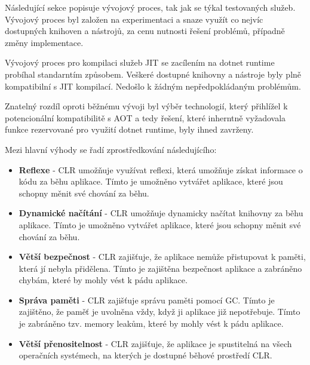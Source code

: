 

Následující sekce popisuje vývojový proces, tak jak se týkal testovaných služeb. Vývojový proces byl založen na experimentaci a snaze využít co nejvíc dostupných knihoven a nástrojů, za cenu nutnosti řešení problémů, případně změny implementace.


Vývojový proces pro kompilaci služeb JIT se zacílením na dotnet runtime probíhal standarntím způsobem. Veškeré dostupné knihovny a nástroje byly plně kompatibilní s JIT kompilací. Nedošlo k žádným nepředpokládaným problémům.

Znatelný rozdíl oproti běžnému vývoji byl výběr technologií, který přihlížel k potencionální kompatibilitě s AOT a tedy řešení, které inherntně vyžadovala funkce rezervované pro využití dotnet runtime, byly ihned zavrženy.


Mezi hlavní výhody se řadí zprostředkování následujícího:

\begin{itemize}
    \item  \textbf{Reflexe} - CLR umožňuje využívat reflexi, která umožňuje získat informace o kódu za běhu aplikace. Tímto je umožněno vytvářet aplikace, které jsou schopny měnit své chování za běhu.
    \item \textbf{Dynamické načítání} - CLR umožňuje dynamicky načítat knihovny za běhu aplikace. Tímto je umožněno vytvářet aplikace, které jsou schopny měnit své chování za běhu.
    \item \textbf{Větší bezpečnost} - CLR zajišťuje, že aplikace nemůže přistupovat k paměti, která jí nebyla přidělena. Tímto je zajištěna bezpečnost aplikace a zabráněno chybám, které by mohly vést k pádu aplikace.
    \item \textbf{Správa paměti} - CLR zajišťuje správu paměti pomocí GC. Tímto je zajištěno, že paměť je uvolněna vždy, když ji aplikace již nepotřebuje. Tímto je zabráněno tzv. memory leakům, které by mohly vést k pádu aplikace.
    \item \textbf{Větší přenositelnost} - CLR zajišťuje, že aplikace je spustitelná na všech operačních systémech, na kterých je dostupné běhové prostředí CLR.
\end{itemize}

